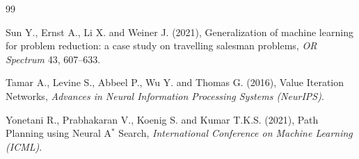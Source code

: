 \documentclass[twoside]{article}
\begin{document}
\begin{thebibliography}{99}
		

		Sun Y., Ernst A., Li X. and Weiner J. (2021), Generalization of machine learning for problem reduction: a case study on travelling salesman problems, {\it OR Spectrum} 43, 607--633.

		

		Tamar A., Levine S., Abbeel P., Wu Y. and Thomas G. (2016), Value Iteration Networks, {\it Advances in Neural Information Processing Systems (NeurIPS)}.

		


		


		


		

		Yonetani R., Prabhakaran V., Koenig S. and Kumar T.K.S. (2021), Path Planning using Neural A$^*$ Search, {\it International Conference on Machine Learning (ICML)}.

				

	\end{thebibliography}

	
\end{document}
